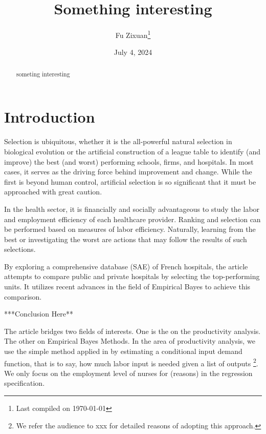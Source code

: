 \documentclass[12pt]{article}
\title{Something interesting}
\author{Fu Zixuan\thanks{Last compiled on \today}}
\date{July 4, 2024}
\begin{document}
\maketitle

\begin{abstract}
    \noindent  someting interesting\\


    \bigskip
\end{abstract}

\newpage
\tableofcontents
\newpage

\section{Introduction}

Selection is ubiquitous, whether it is the all-powerful natural selection in
biological evolution or the artificial construction of a league table to
identify (and improve) the best (and worst) performing schools, firms, and
hospitals. In most cases, it serves as the driving force behind improvement and
change. While the first is beyond human control, artificial selection is so
significant that it must be approached with great caution.

In the health sector, it is financially and socially advantageous to study the
labor and employment efficiency of each healthcare provider. Ranking and
selection can be performed based on measures of labor efficiency. Naturally,
learning from the best or investigating the worst are actions that may follow
the results of such selections.

By exploring a comprehensive database (SAE) of French hospitals, the article
attempts to compare public and private hospitals by selecting the
top-performing units. It utilizes recent advances in the field of Empirical
Bayes to achieve this comparison.

***Conclusion Here**

The article bridges two fields of interests. One is the on the productivity
analysis. The other on Empirical Bayes Methods. In the area of productivity
analysis, we use the simple method applied in \cite{CroisetGarybobo_2024} by
estimating a conditional input demand function, that is to say, how much labor
input is needed given a list of outputs \footnote{We refer the audience to xxx
    for detailed reasons of adopting this approach.}. We only focus on the
employment level of nurses for (reasons) in the regression specification.
\end{document}
